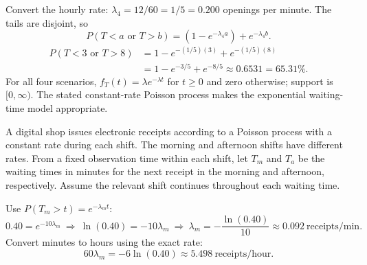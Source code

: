 \Needspace{11cm}
Convert the hourly rate: $\lambda_4=12/60=1/5=0.200$ openings per minute.
The tails are disjoint, so
\[P(T<a\text{ or }T>b)=(1-e^{-\lambda_4a})+e^{-\lambda_4b}.\]
\[\begin{aligned}P(T<3\text{ or }T>8)&=1-e^{-(1/5)(3)}+e^{-(1/5)(8)}\\
&=\boxed{1-e^{-3/5}+e^{-8/5}\approx0.6531=65.31\%}.\end{aligned}\]
For all four scenarios, $f_T(t)=\lambda e^{-\lambda t}$ for $t\ge0$ and zero otherwise; support is $[0,\infty)$.
The stated constant-rate Poisson process makes the exponential waiting-time model appropriate.

A digital shop issues electronic receipts according to a Poisson process with a constant rate during each shift. The morning and afternoon shifts have different rates. From a fixed observation time within each shift, let $T_m$ and $T_a$ be the waiting times in minutes for the next receipt in the morning and afternoon, respectively. Assume the relevant shift continues throughout each waiting time.


Use $P(T_m>t)=e^{-\lambda_m t}$:
\[0.40=e^{-10\lambda_m}\ \Longrightarrow\ \ln(0.40)=-10\lambda_m
\ \Longrightarrow\ \lambda_m=-\frac{\ln(0.40)}{10}\approx0.092\ \text{receipts/min}.\]
Convert minutes to hours using the exact rate:
\[60\lambda_m=-6\ln(0.40)\approx\boxed{5.498\ \text{receipts/hour}}.\]

